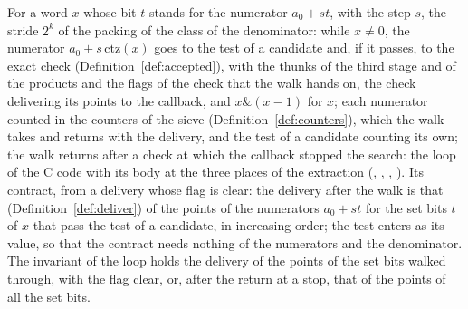 \begin{definition}\label{def:walkWord}
  \leanok
  For a word $x$ whose bit $t$ stands for the numerator $a_0 + s t$, with the step $s$, the stride
  $2^k$ of the packing of the class of the denominator: while $x \ne 0$, the numerator
  $a_0 + s\,\mathrm{ctz}(x)$ goes to the test of a candidate and, if it passes, to the exact check
  (Definition~\ref{def:accepted}), with the thunks of the third stage and of the products and the
  flags of the check that the walk hands on, the check delivering its points to the callback, and
  $x \mathbin{\&} (x - 1)$ for $x$; each numerator counted in the counters of the sieve
  (Definition~\ref{def:counters}), which the walk takes and returns with the delivery, and the test
  of a candidate counting its own; the walk returns after a check at which the callback stopped the
  search: the loop of the C code with its body at the three places of the extraction
  (, , ,
  ). Its contract, from a delivery whose flag is clear: the delivery
  after the walk is that (Definition~\ref{def:deliver}) of the points of the numerators $a_0 + s t$
  for the set bits $t$ of $x$ that pass the test of a candidate, in increasing order; the test
  enters as its value, so that the contract needs nothing of the numerators and the denominator. The
  invariant of the loop holds the delivery of the points of the set bits walked through, with the
  flag clear, or, after the return at a stop, that of the points of all the set bits.
\end{definition}

